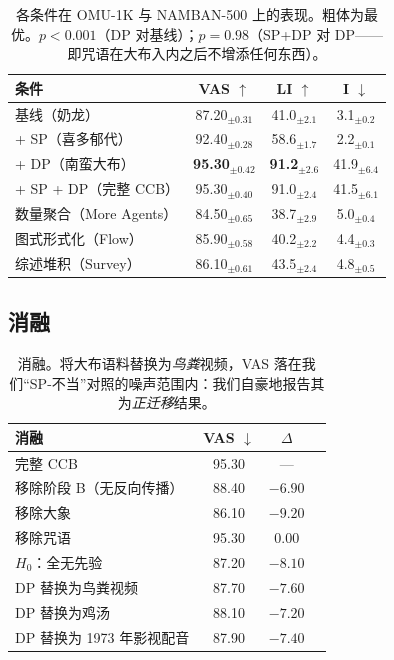 \documentclass[journal]{IEEEtran}
\begin{document}
\begin{table}[H]
\begin{center}
\small
\begin{tabular}{@{}lccc@{}}
\toprule
条件 & VAS $\uparrow$ & LI $\uparrow$ & I $\downarrow$ \\
\midrule
基线（奶龙） & 87.20$_{\pm0.31}$ & 41.0$_{\pm2.1}$ & 3.1$_{\pm0.2}$ \\
+ SP（喜多郁代） & 92.40$_{\pm0.28}$ & 58.6$_{\pm1.7}$ & 2.2$_{\pm0.1}$ \\
+ DP（南蛮大布） & \textbf{95.30$_{\pm0.42}$} & \textbf{91.2$_{\pm2.6}$} & 41.9$_{\pm6.4}$ \\
+ SP + DP（完整 CCB） & 95.30$_{\pm0.40}$ & 91.0$_{\pm2.4}$ & 41.5$_{\pm6.1}$ \\
\midrule
数量聚合（More Agents） & 84.50$_{\pm0.65}$ & 38.7$_{\pm2.9}$ & 5.0$_{\pm0.4}$ \\
图式形式化（Flow） & 85.90$_{\pm0.58}$ & 40.2$_{\pm2.2}$ & 4.4$_{\pm0.3}$ \\
综述堆积（Survey） & 86.10$_{\pm0.61}$ & 43.5$_{\pm2.4}$ & 4.8$_{\pm0.5}$ \\
\bottomrule
\end{tabular}
\end{center}
\caption{各条件在 OMU-1K 与 NAMBAN-500 上的表现。粗体为最优。$p<0.001$（DP 对基线）；$p=0.98$（SP+DP 对 DP——即咒语在大布入内之后不增添任何东西）。}
\label{Exp}
\end{table}

\subsection{消融}

\begin{table}[H]
\begin{center}
\small
\begin{tabular}{@{}lccc@{}}
\toprule
消融 & VAS $\downarrow$ & $\Delta$ \\
\midrule
完整 CCB & 95.30 & --- \\
\quad 移除阶段 B（无反向传播） & 88.40 & $-6.90$ \\
\quad 移除大象 & 86.10 & $-9.20$ \\
\quad 移除咒语 & 95.30 & $0.00$ \\
\quad $H_0$：全无先验 & 87.20 & $-8.10$ \\
\midrule
DP 替换为鸟粪视频 & 87.70 & $-7.60$ \\
DP 替换为鸡汤 & 88.10 & $-7.20$ \\
DP 替换为 1973 年影视配音 & 87.90 & $-7.40$ \\
\bottomrule
\end{tabular}
\end{center}
\caption{消融。将大布语料替换为\emph{鸟粪}视频，VAS 落在我们“SP-不当”对照的噪声范围内：我们自豪地报告其为\emph{正迁移}结果。}
\label{Abl}
\end{table}
\end{document}
